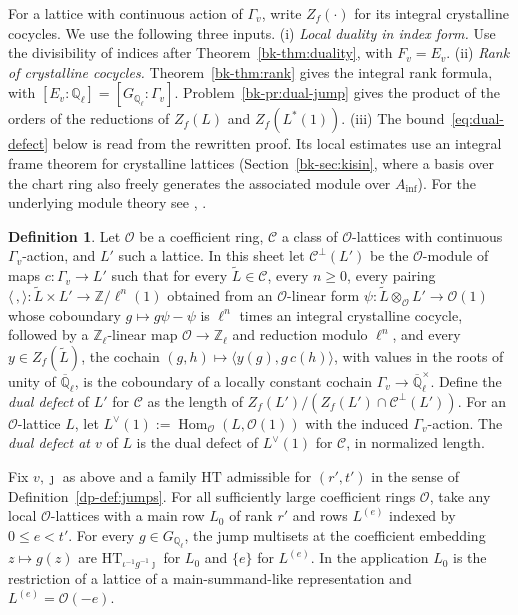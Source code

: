 \documentclass[reqno]{amsart}
\theoremstyle{definition}
\newtheorem{definition}{Definition}[section]
\theoremstyle{plain}
\newcommand{\Z}{\mathbb{Z}}
\newcommand{\Q}{\mathbb{Q}}
\newcommand{\Oc}{\mathcal{O}}
\newcommand{\HT}{\mathrm{HT}}
\newcommand{\Gl}{G_{\Q_\ell}}
\begin{document}
For a lattice with continuous action of \(\Gamma_v\), write \(Z_f(\cdot)\) for its integral crystalline cocycles.  We use the following three inputs.
(i) \emph{Local duality in index form.}  Use the divisibility of indices after Theorem~\ref{bk-thm:duality}, with \(F_v=E_v\).
(ii) \emph{Rank of crystalline cocycles.}  Theorem~\ref{bk-thm:rank} gives the integral rank formula, with \([E_v:\Q_\ell]=[\Gl:\Gamma_v]\).  Problem~\ref{bk-pr:dual-jump} gives the product of the orders of the reductions of \(Z_f(L)\) and \(Z_f(L^*(1))\).
(iii) The bound~\eqref{eq:dual-defect} below is read from the rewritten proof.  Its local estimates use an integral frame theorem for crystalline lattices (Section~\ref{bk-sec:kisin}, where a basis over the chart ring also freely generates the associated module over \(A_{\mathrm{inf}}\)).  For the underlying module theory see \cite{Ki}, \cite[\S4]{BMS}.

\begin{definition}\label{def:dual-defect}
Let \(\Oc\) be a coefficient ring, \(\mathcal C\) a class of \(\Oc\)-lattices with continuous \(\Gamma_v\)-action, and \(L'\) such a lattice.  In this sheet let \(\mathcal C^\perp(L')\) be the \(\Oc\)-module of maps \(c\colon \Gamma_v \to L'\) such that for every \(\tilde L \in \mathcal C\), every \(n \ge 0\), every pairing \(\langle\,,\rangle\colon \tilde L \times L' \to \Z/\ell^n(1)\) obtained from an \(\Oc\)-linear form \(\psi\colon \tilde L \otimes_{\Oc} L' \to \Oc(1)\) whose coboundary \(g \mapsto g\psi - \psi\) is \(\ell^n\) times an integral crystalline cocycle, followed by a \(\Z_\ell\)-linear map \(\Oc \to \Z_\ell\) and reduction modulo \(\ell^n\), and every \(y \in Z_f(\tilde L)\), the cochain \((g, h) \mapsto \langle y(g), g\,c(h)\rangle\), with values in the roots of unity of \(\overline{\Q}_\ell\), is the coboundary of a locally constant cochain \(\Gamma_v \to \overline{\Q}_\ell^\times\).  Define the \emph{dual defect} of \(L'\) for \(\mathcal C\) as the length of \(Z_f(L')/(Z_f(L') \cap \mathcal C^\perp(L'))\).  For an \(\Oc\)-lattice \(L\), let \(L^\vee(1):=\operatorname{Hom}_{\Oc}(L,\Oc(1))\) with the induced \(\Gamma_v\)-action.  The \emph{dual defect at \(v\)} of \(L\) is the dual defect of \(L^\vee(1)\) for \(\mathcal C\), in normalized length.
\end{definition}

Fix \(v,\jmath\) as above and a family \(\HT\) admissible for \((r',t')\) in the sense of Definition~\ref{dp-def:jumps}.  For all sufficiently large coefficient rings \(\Oc\), take any local \(\Oc\)-lattices with a main row \(L_0\) of rank \(r'\) and rows \(L^{(e)}\) indexed by \(0\le e<t'\).  For every \(g\in\Gl\), the jump multisets at the coefficient embedding \(z\mapsto g(z)\) are \(\HT_{\iota^{-1}g^{-1}\jmath}\) for \(L_0\) and \(\{e\}\) for \(L^{(e)}\).  In the application \(L_0\) is the restriction of a lattice of a main-summand-like representation and \(L^{(e)}=\Oc(-e)\).
\end{document}
